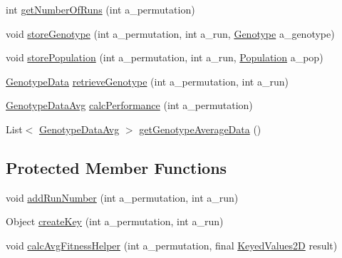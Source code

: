 \begin{DoxyCompactItemize}
\item 
int \hyperlink{classorg_1_1jgap_1_1audit_1_1_evaluator_aa7d5310dff0a906381202f502f24565c}{get\-Number\-Of\-Runs} (int a\-\_\-permutation)
\item 
void \hyperlink{classorg_1_1jgap_1_1audit_1_1_evaluator_a5279539edcf3b0cba17ca726072194f1}{store\-Genotype} (int a\-\_\-permutation, int a\-\_\-run, \hyperlink{classorg_1_1jgap_1_1_genotype}{Genotype} a\-\_\-genotype)
\item 
void \hyperlink{classorg_1_1jgap_1_1audit_1_1_evaluator_a48f84bb9929cec12795c98bf1185ac68}{store\-Population} (int a\-\_\-permutation, int a\-\_\-run, \hyperlink{classorg_1_1jgap_1_1_population}{Population} a\-\_\-pop)
\item 
\hyperlink{classorg_1_1jgap_1_1audit_1_1_evaluator_1_1_genotype_data}{Genotype\-Data} \hyperlink{classorg_1_1jgap_1_1audit_1_1_evaluator_af00e41cf4dfd12a799a1c4f3e2f7f1a9}{retrieve\-Genotype} (int a\-\_\-permutation, int a\-\_\-run)
\item 
\hyperlink{classorg_1_1jgap_1_1audit_1_1_evaluator_1_1_genotype_data_avg}{Genotype\-Data\-Avg} \hyperlink{classorg_1_1jgap_1_1audit_1_1_evaluator_a586c5d8e9e31c16f2187c09f3f320727}{calc\-Performance} (int a\-\_\-permutation)
\item 
List$<$ \hyperlink{classorg_1_1jgap_1_1audit_1_1_evaluator_1_1_genotype_data_avg}{Genotype\-Data\-Avg} $>$ \hyperlink{classorg_1_1jgap_1_1audit_1_1_evaluator_a4860d3c1dadcc98c8889552e62358b67}{get\-Genotype\-Average\-Data} ()
\end{DoxyCompactItemize}
\subsection*{Protected Member Functions}
\begin{DoxyCompactItemize}
\item 
void \hyperlink{classorg_1_1jgap_1_1audit_1_1_evaluator_a1ab07be10354b09f0dbd5d22e8eed926}{add\-Run\-Number} (int a\-\_\-permutation, int a\-\_\-run)
\item 
Object \hyperlink{classorg_1_1jgap_1_1audit_1_1_evaluator_a8fe0028b3b402c3a4844d65f584a846a}{create\-Key} (int a\-\_\-permutation, int a\-\_\-run)
\item 
void \hyperlink{classorg_1_1jgap_1_1audit_1_1_evaluator_a8f86ce5030064340d82ec8a96b2b6e21}{calc\-Avg\-Fitness\-Helper} (int a\-\_\-permutation, final \hyperlink{classorg_1_1jgap_1_1audit_1_1_keyed_values2_d}{Keyed\-Values2\-D} result)
\end{DoxyCompactItemize}
